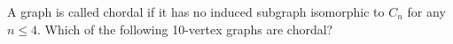 \documentclass[12pt]{article}
\newenvironment{question}[2][Question]{\begin{trivlist}
\item[\hskip \labelsep {\bfseries #1}\hskip \labelsep {\bfseries #2.}]}{\end{trivlist}}
\begin{document}
\begin{question}{7}
A graph is called chordal if it has no induced subgraph isomorphic to $C_{n}$ for any $n \leq 4$. Which of the following 10-vertex graphs are chordal?
\end{question}

\begin{align*}	
\end{align*}
 
 
\end{document}
